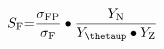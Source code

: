 \[S_{\mathrm{F}}\mathrm{=}\frac{{\sigma }_{\mathrm{FP}}}{{\sigma }_{\mathrm{F}}}\bullet \frac{Y_{\mathrm{N}}}{Y_{\mathrm{\thetaup }}\bullet Y_{\mathrm{Z}}}\]